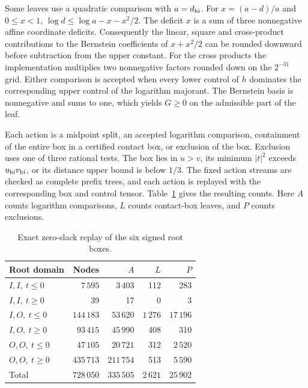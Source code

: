 \documentclass[11pt,letterpaper]{article}
\theoremstyle{remark}
\begin{document}
Some leaves use a quadratic comparison with \(a=d_{\rm hi}\).
For \(x=(a-d)/a\) and \(0\le x<1\),
\(\log d\le\log a-x-x^2/2\). The deficit \(x\) is a sum of
three nonnegative affine coordinate deficits. Consequently the
linear, square and cross-product contributions to the Bernstein
coefficients of \(x+x^2/2\) can be rounded downward before
subtraction from the upper constant. For the cross products the
implementation multiplies two nonnegative factors rounded down
on the \(2^{-31}\) grid. Either comparison is accepted when every
lower control of \(h\) dominates the corresponding upper control
of the logarithm majorant. The Bernstein basis is nonnegative and
sums to one, which yields \(G\ge0\) on the admissible part of the leaf.

Each action is a midpoint split, an accepted logarithm comparison,
containment of the entire box in a certified contact box, or exclusion
of the box. Exclusion uses one of three rational tests. The box
lies in \(u>v\), its minimum \(|t|^2\) exceeds \(u_{\rm hi}v_{\rm hi}\),
or its distance upper bound is below \(1/3\). The fixed action
streams are checked as complete prefix trees, and each action is
replayed with the corresponding box and control tensor.
Table~\ref{tab:n12-cover-counts} gives the resulting counts.
Here \(A\) counts logarithm comparisons, \(L\) counts contact-box
leaves, and \(P\) counts exclusions.

\begin{table}[ht]
\centering
\begin{tabular}{@{}lrrrr@{}}
\toprule
Root domain & Nodes & \(A\) & \(L\) & \(P\)\\
\midrule
\(I,I,\ t\le0\) & \(7\,595\) & \(3\,403\) & 112 & 283\\
\(I,I,\ t\ge0\) & 39 & 17 & 0 & 3\\
\(I,O,\ t\le0\) & \(144\,183\) & \(53\,620\) & \(1\,276\) & \(17\,196\)\\
\(I,O,\ t\ge0\) & \(93\,415\) & \(45\,990\) & 408 & 310\\
\(O,O,\ t\le0\) & \(47\,105\) & \(20\,721\) & 312 & \(2\,520\)\\
\(O,O,\ t\ge0\) & \(435\,713\) & \(211\,754\) & 513 & \(5\,590\)\\
\midrule
Total & \(728\,050\) & \(335\,505\) & \(2\,621\) & \(25\,902\)\\
\bottomrule
\end{tabular}
\caption{Exact zero-slack replay of the six signed root boxes.}
\label{tab:n12-cover-counts}
\end{table}
\end{document}
